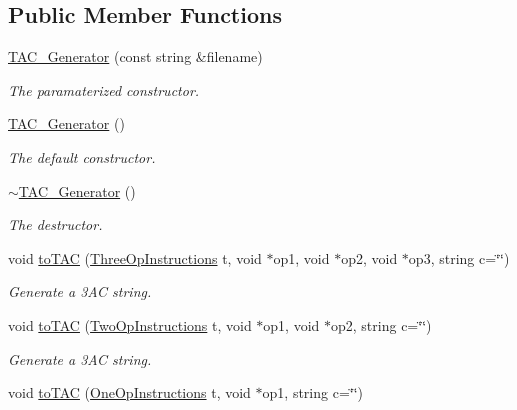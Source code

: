 \subsection*{Public Member Functions}
\begin{DoxyCompactItemize}
\item 
\hyperlink{classTAC__Generator_a0b99317caae367b6e6f2a2ca89be1da1}{T\-A\-C\-\_\-\-Generator} (const string \&filename)
\begin{DoxyCompactList}\small\item\em The paramaterized constructor. \end{DoxyCompactList}\item 
\hyperlink{classTAC__Generator_aa4dfb06c9feb7fa4f95cdc382ab9809c}{T\-A\-C\-\_\-\-Generator} ()
\begin{DoxyCompactList}\small\item\em The default constructor. \end{DoxyCompactList}\item 
\hyperlink{classTAC__Generator_a66d2bfd04edb3098bf3e9f7b24be579f}{$\sim$\-T\-A\-C\-\_\-\-Generator} ()
\begin{DoxyCompactList}\small\item\em The destructor. \end{DoxyCompactList}\item 
void \hyperlink{classTAC__Generator_aacf385dd067825fd35a315d04ea9c78f}{to\-T\-A\-C} (\hyperlink{classTAC__Generator_ae032b80a215a10604c5273b65e7dab4c}{Three\-Op\-Instructions} t, void $\ast$op1, void $\ast$op2, void $\ast$op3, string c=\char`\"{}\char`\"{})
\begin{DoxyCompactList}\small\item\em Generate a 3\-A\-C string. \end{DoxyCompactList}\item 
void \hyperlink{classTAC__Generator_a7e5f15afb7c6b13793db76d1091f113c}{to\-T\-A\-C} (\hyperlink{classTAC__Generator_a4e5a63c4a55a85d34f6ffebe5bf48129}{Two\-Op\-Instructions} t, void $\ast$op1, void $\ast$op2, string c=\char`\"{}\char`\"{})
\begin{DoxyCompactList}\small\item\em Generate a 3\-A\-C string. \end{DoxyCompactList}\item 
void \hyperlink{classTAC__Generator_a78507356e58ed7ff406314e8ce566ad8}{to\-T\-A\-C} (\hyperlink{classTAC__Generator_ab58b7044cb5d16a454f4e01514175123}{One\-Op\-Instructions} t, void $\ast$op1, string c=\char`\"{}\char`\"{})

\end{DoxyCompactItemize}
